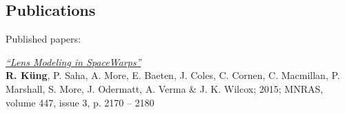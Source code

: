 \documentclass[margin,line]{resume}
\begin{document}
\begin{resume}
\section{\mysidestyle Publications}

Published papers:

\begin{list2}
  \item
    {\small \emph{\href{http://arxiv.org/abs/1234.1234}{``Lens Modeling in SpaceWarps''}}}\\
    {\bf R. Küng},
		P. Saha,
		A. More,
		E. Baeten,
		J. Coles,
		C. Cornen,
		C. Macmillan,
		P. Marshall,
		S. More,
		J. Odermatt,
		A. Verma \&
		J. K. Wilcox;
	    2015;
	    MNRAS, volume 447, issue 3, p. 2170 -- 2180
\end{list2}



%
%






\end{resume}
\end{document}
